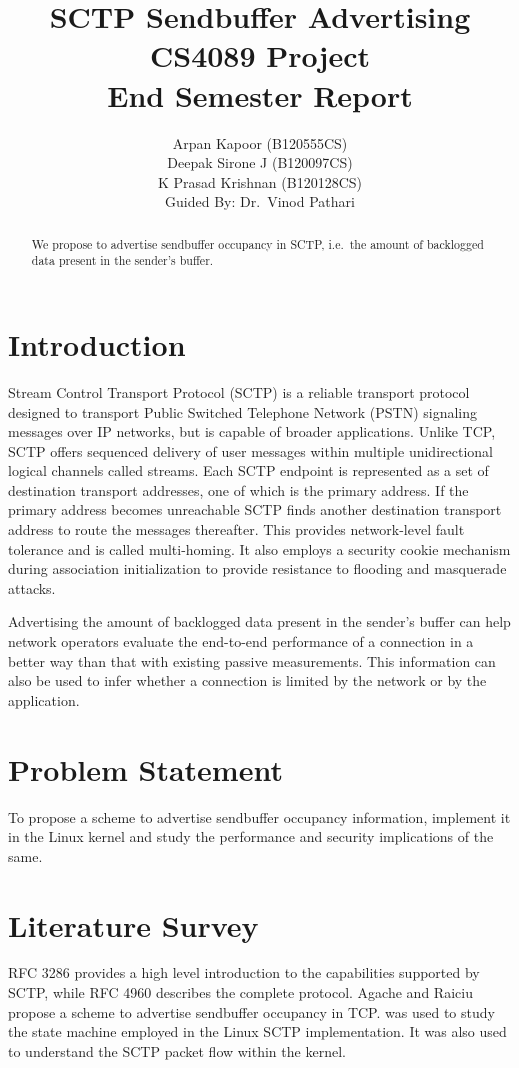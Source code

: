 \documentclass[a4paper,11pt]{article}
\title{SCTP Sendbuffer Advertising\\
	{\normalsize CS4089 Project\\
		End Semester Report}}
\author{Arpan Kapoor (B120555CS)\\
	Deepak Sirone J (B120097CS)\\
	K Prasad Krishnan (B120128CS)\\
	Guided By: Dr.~Vinod Pathari}
\begin{document}
\maketitle

\begin{abstract}
We propose to advertise sendbuffer occupancy in SCTP, i.e.\ 
the amount of backlogged data present in the sender's buffer.
\end{abstract}

\section{Introduction}
Stream Control Transport Protocol (SCTP) is a reliable transport protocol
designed to transport Public Switched Telephone Network (PSTN) signaling
messages over IP networks, but is capable of broader applications.
Unlike TCP, SCTP offers sequenced delivery of user messages within multiple
unidirectional logical channels called streams.
Each SCTP endpoint is represented as a set of destination transport addresses,
one of which is the primary address. If the primary address becomes unreachable
SCTP finds another destination transport address to route the messages 
thereafter. This provides network-level fault tolerance and is called
multi-homing.
It also employs a security cookie mechanism during association initialization
to provide resistance to flooding and masquerade attacks.

Advertising the amount of backlogged data present in the sender's buffer can
help network operators evaluate the end-to-end performance of a connection
in a better way than that with existing passive measurements.
This information can also be used to infer whether a connection is limited
by the network or by the application.

\section{Problem Statement}
To propose a scheme to advertise sendbuffer occupancy information,
implement it in the Linux kernel and study the performance and security
implications of the same.

\section{Literature Survey}
RFC 3286 \cite{rfc3286} provides a high level introduction to the capabilities
supported by SCTP, while RFC 4960 \cite{rfc4960} describes the complete
protocol. Agache and Raiciu \cite{tcp-sndbufadv} propose a scheme to advertise
sendbuffer occupancy in TCP. \cite{budigerelinux} was used to study the state
machine employed in the Linux SCTP implementation. It was also used to 
understand the SCTP packet flow within the kernel.
\end{document}
